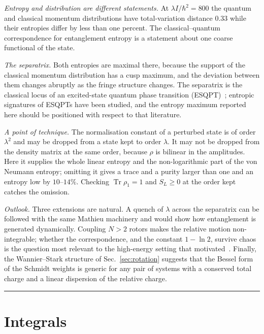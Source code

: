 \documentclass[preprint,12pt]{elsarticle}
\newcommand{\Tr}{\operatorname{Tr}}
\begin{document}
\emph{Entropy and distribution are different statements.} At
$\lambda I/\hbar^{2}=800$ the quantum and classical momentum distributions have
total-variation distance $0.33$ while their entropies differ by less than one
percent. The classical--quantum correspondence for entanglement entropy is a
statement about one coarse functional of the state.

\emph{The separatrix.} Both entropies are maximal there, because the support of
the classical momentum distribution has a cusp maximum, and the deviation
between them changes abruptly as the fringe structure changes. The separatrix is
the classical locus of an excited-state quantum phase transition
(ESQPT)~\cite{CaprioCejnarIachello,Stransky,Cejnar}; entropic signatures of
ESQPTs have been studied, and the entropy maximum reported here should be
positioned with respect to that literature.

\emph{A point of technique.} The normalisation constant of a perturbed state is
of order $\lambda^{2}$ and may be dropped from a state kept to order $\lambda$.
It may not be dropped from the density matrix at the same order, because $\rho$
is bilinear in the amplitudes. Here it supplies the whole linear entropy and the
non-logarithmic part of the von Neumann entropy; omitting it gives a trace and a
purity larger than one and an entropy low by $10$--$14\%$. Checking
$\Tr\rho_{1}=1$ and $S_{L}\ge0$ at the order kept catches the omission.

\emph{Outlook.} Three extensions are natural. A quench of $\lambda$ across the
separatrix can be followed with the same Mathieu machinery and would show how
entanglement is generated dynamically. Coupling $N>2$ rotors makes the relative
motion non-integrable; whether the correspondence, and the constant $1-\ln2$,
survive chaos is the question most relevant to the high-energy setting that
motivated~\cite{DKS}. Finally, the Wannier--Stark structure of
Sec.~\ref{sec:rotation} suggests that the Bessel form of the Schmidt weights is
generic for any pair of systems with a conserved total charge and a linear
dispersion of the relative charge.

\begin{center}\rule{0.4\linewidth}{0.4pt}\end{center}

\appendix

\section{Integrals}
\label{app:integrals}
\end{document}

